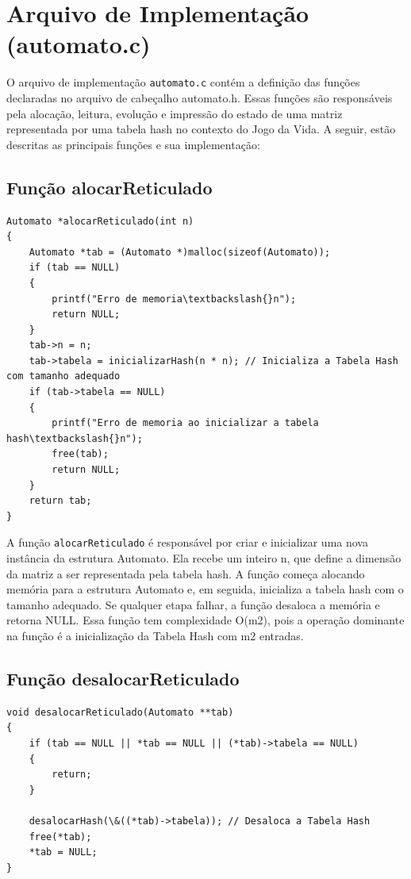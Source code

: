\documentclass{article}
\begin{document}
\section{Arquivo de Implementação (automato.c)}

O arquivo de implementação \verb|automato.c| contém a definição das funções declaradas no arquivo de cabeçalho automato.h. Essas funções são responsáveis pela alocação, leitura, evolução e impressão do estado de uma matriz representada por uma tabela hash no contexto do Jogo da Vida. A seguir, estão descritas as principais funções e sua implementação:

\subsection{Função alocarReticulado}
\begin{lstlisting}[caption={},label={lst:cod1},language={[x86masm]Assembler}]
Automato *alocarReticulado(int n)
{
    Automato *tab = (Automato *)malloc(sizeof(Automato));
    if (tab == NULL)
    {
        printf("Erro de memoria\textbackslash{}n");
        return NULL;
    }
    tab->n = n;
    tab->tabela = inicializarHash(n * n); // Inicializa a Tabela Hash com tamanho adequado
    if (tab->tabela == NULL)
    {
        printf("Erro de memoria ao inicializar a tabela hash\textbackslash{}n");
        free(tab);
        return NULL;
    }
    return tab;
}

 \end{lstlisting}

 \par A função \verb|alocarReticulado| é responsável por criar e inicializar uma nova instância da estrutura Automato. Ela recebe um inteiro n, que define a dimensão da matriz a ser representada pela tabela hash. A função começa alocando memória para a estrutura Automato e, em seguida, inicializa a tabela hash com o tamanho adequado. Se qualquer etapa falhar, a função desaloca a memória e retorna NULL. Essa função tem complexidade O(m2), pois a operação dominante na função é a inicialização da Tabela Hash com m2 entradas.  

\subsection{Função desalocarReticulado  }

\begin{lstlisting}[caption={},label={lst:cod1},language={[x86masm]Assembler}]
void desalocarReticulado(Automato **tab)
{
    if (tab == NULL || *tab == NULL || (*tab)->tabela == NULL)
    {
        return;
    }
    
    desalocarHash(\&((*tab)->tabela)); // Desaloca a Tabela Hash
    free(*tab);
    *tab = NULL;
}

 \end{lstlisting}
\end{document}
